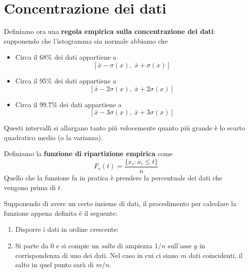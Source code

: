 \section{Concentrazione dei dati}
\begin{definition}
	Definiamo ora una \textbf{regola empirica sulla concentrazione dei dati}: supponendo che
	l'istogramma sia normale abbiamo che
	\begin{itemize}
		\item Circa il 68\% dei dati appartiene a
		      \[ [ \bar{x} - \sigma(x),\; \bar{x} + \sigma(x) ] \]
		\item Circa il 95\% dei dati appartiene a
		      \[ [ \bar{x} - 2 \sigma(x),\; \bar{x} + 2 \sigma(x) ] \]
		\item Circa il 99.7\% dei dati appartiene a
		      \[ [ \bar{x} - 3 \sigma(x),\; \bar{x} + 3 \sigma(x) ] \]
	\end{itemize}
	Questi intervalli si allargano tanto più velocemente quanto più grande è lo scarto quadratico
	medio (o la varianza).
\end{definition}

\begin{definition}
	Definiamo la \textbf{funzione di ripartizione empirica} come
	\[ F_e(t) = \frac{\{ x_i : x_i \leq t \}}{n} \]
	Quello che la funzione fa in pratica è prendere la percentuale dei dati che vengono prima di
	$t$.
\end{definition}

Supponendo di avere un certo insieme di dati, il procedimento per calcolare la funzione appena
definita è il seguente:
\begin{enumerate}
	\item Disporre i dati in ordine crescente:
	\item Si parte da 0 e si compie un \emph{salto} di ampiezza $1 / n$ sull'asse $y$ in
	      corrispondenza di uno dei dati. Nel caso in cui ci siano $m$ dati coincidenti, il salto
	      in quel punto sarà di $m / n$.
\end{enumerate}

